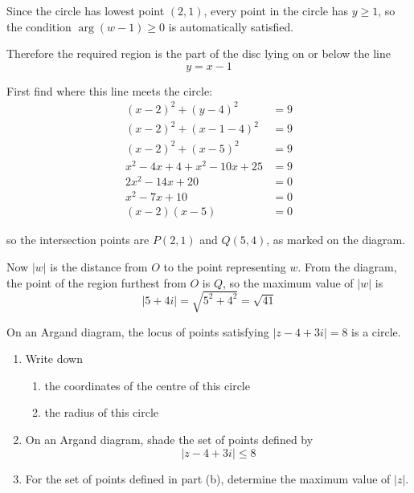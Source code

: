 \documentclass[leqno]{article}
\begin{document}
\begin{enumerate}[
  label=\textbf{\arabic*.},
  leftmargin=*,
  topsep=0pt,
  partopsep=0pt,
  parsep=0pt
]
\begin{djsSolution}
\begin{enumerate}[label=\textbf{(\alph*)}]
\begin{figure}[H]
\begin{tikzpicture}[scale=0.7]
\end{tikzpicture}
\end{figure}

  Since the circle has lowest point $(2,1)$, every point in the circle has $y\geq 1$, so the condition $\arg(w-1)\geq 0$ is automatically satisfied.

  Therefore the required region is the part of the disc lying on or below the line
  \[
  y=x-1
  \]

  First find where this line meets the circle:
  \begin{align*}
  (x-2)^2+(y-4)^2&=9 \\
  (x-2)^2+(x-1-4)^2&=9 \\
  (x-2)^2+(x-5)^2&=9 \\
  x^2-4x+4+x^2-10x+25&=9 \\
  2x^2-14x+20&=0 \\
  x^2-7x+10&=0 \\
  (x-2)(x-5)&=0
  \end{align*}

  so the intersection points are $P(2,1)$ and $Q(5,4)$, as marked on the diagram.

  Now $|w|$ is the distance from $O$ to the point representing $w$. From the diagram, the point of the region furthest from $O$ is $Q$, so the maximum value of $|w|$ is
  \[
  |5+4i|=\sqrt{5^2+4^2}=\sqrt{41}
  \]

\end{enumerate}
\end{djsSolution}


\newpage

\questionitem

On an Argand diagram, the locus of points satisfying $|z-4+3i|=8$ is a circle. \\

\begin{enumerate}[label=\textbf{(\alph*)}]
  \item Write down
  \begin{enumerate}[label=(\roman*)]
    \item the coordinates of the centre of this circle 
    \item the radius of this circle 
  \end{enumerate}
  \item On an Argand diagram, shade the set of points defined by
  \[
  |z-4+3i|\le 8
  \]
  \item For the set of points defined in part (b), determine the maximum value of $|z|$.  \\
\end{enumerate}


\end{enumerate}
\end{document}

